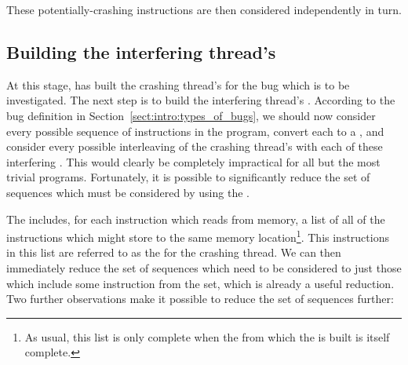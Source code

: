 These potentially-crashing instructions are then considered
independently in turn.

\subsection{Building the interfering thread's \StateMachines}
\label{sect:derive:write_side}

At this stage, {\technique} has built the crashing thread's
{\StateMachine} for the bug which is to be investigated.  The next
step is to build the interfering thread's {\StateMachine}.  According
to the bug definition in Section~\ref{sect:intro:types_of_bugs}, we
should now consider every possible sequence of \backref{$\alpha$}
instructions in the program, convert each to a {\StateMachine}, and
consider every possible interleaving of the crashing thread's
{\StateMachine} with each of these interfering {\StateMachines}.  This
would clearly be completely impractical for all but the most trivial
programs.  Fortunately, it is possible to significantly reduce the set
of sequences which must be considered by using the .

The  includes, for each instruction which reads
from memory, a list of all of the instructions which might store to
the same memory location\footnote{As usual, this list is only complete
  when the  from which the  is built is itself complete.}.  This instructions in this
list are referred to as the  for the
crashing thread.  We can then immediately reduce the set of sequences
which need to be considered to just those which include some
instruction from the  set, which is
already a useful reduction.  Two further observations make it possible
to reduce the set of sequences further:

